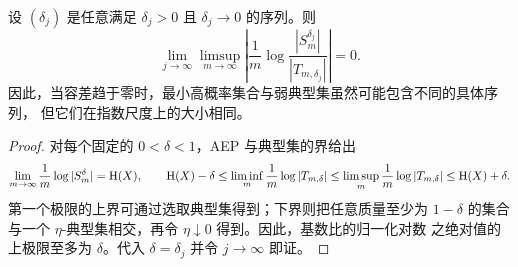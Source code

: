 \begin{proposition}[两种典型集的指数等价性]\label{prop:typical-set-equivalence}
设 $(\delta_j)$ 是任意满足 $\delta_j>0$ 且 $\delta_j\to0$ 的序列。则
\[
  \lim_{j\to\infty}\limsup_{m\to\infty}
  \left|\frac1m\log
  \frac{|S_m^{\delta_j}|}{|T_{m,\delta_j}|}\right|=0.
\]
因此，当容差趋于零时，最小高概率集合与弱典型集虽然可能包含不同的具体序列，
但它们在指数尺度上的大小相同。
\end{proposition}

\begin{proof}
对每个固定的 $0<\delta<1$，AEP 与典型集的界给出
\[
  \lim_{m\to\infty}\frac1m\log|S_m^\delta|=\mathrm{H}(X),
  \qquad
  \mathrm{H}(X)-\delta
  \le\liminf_m\frac1m\log|T_{m,\delta}|
  \le\limsup_m\frac1m\log|T_{m,\delta}|
  \le\mathrm{H}(X)+\delta.
\]
第一个极限的上界可通过选取典型集得到；下界则把任意质量至少为 $1-\delta$ 的集合
与一个 $\eta$-典型集相交，再令 $\eta\downarrow0$ 得到。因此，基数比的归一化对数
之绝对值的上极限至多为 $\delta$。代入 $\delta=\delta_j$ 并令 $j\to\infty$ 即证。
\end{proof}

